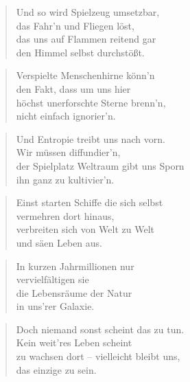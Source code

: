 \documentclass[10pt,a4paper]{article}
\begin{document}
\begin{paracol}{2}
\begin{verse}
Und so wird Spielzeug umsetzbar, \\
das Fahr’n und Fliegen löst, \\
das uns auf Flammen reitend gar \\
den Himmel selbst durchstößt. \\
\end{verse}

\begin{verse}
Verspielte Menschenhirne könn’n \\
den Fakt, dass um uns hier \\
höchst unerforschte Sterne brenn’n, \\
nicht einfach ignorier’n. \\
\end{verse}

\begin{verse}
Und Entropie treibt uns nach vorn. \\
Wir müssen diffundier’n, \\
der Spielplatz Weltraum gibt uns Sporn \\
ihn ganz zu kultivier’n. \\
\end{verse}

\begin{verse}
Einst starten Schiffe die sich selbst \\
vermehren dort hinaus, \\
verbreiten sich von Welt zu Welt \\
und säen Leben aus. \\
\end{verse}

\begin{verse}
In kurzen Jahrmillionen nur \\
vervielfältigen sie \\
die Lebensräume der Natur \\
in uns’rer Galaxie. \\
\end{verse}

\begin{verse}
Doch niemand sonst scheint das zu tun. \\
Kein weit’res Leben scheint \\
zu wachsen dort – vielleicht bleibt uns, \\
das einzige zu sein. \\
\end{verse}


\end{paracol}
\end{document}
